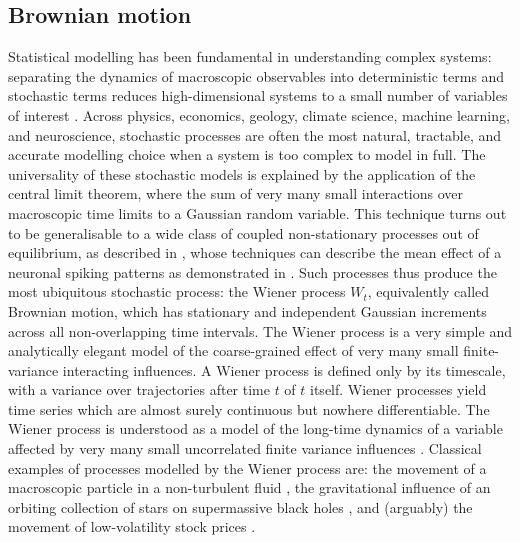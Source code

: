\subsection{Brownian motion}\label{brown_mot}
Statistical modelling has been fundamental in understanding complex systems: separating the dynamics of macroscopic observables into deterministic terms and stochastic terms reduces high-dimensional systems to a small number of variables of interest \cite{hassler_stochastic_2016, cunchala2024basicoverviewvariousstochastic}. Across physics, economics, geology, climate science, machine learning, and neuroscience, stochastic processes are often the most natural, tractable, and accurate modelling choice when a system is too complex to model in full. The universality of these stochastic models is explained by the application of the central limit theorem, where the sum of very many small interactions over macroscopic time limits to a Gaussian random variable. This technique turns out to be generalisable to a wide class of coupled non-stationary processes out of equilibrium, as described in \textcite{Izvekov_2025_Mori}, whose techniques can describe the mean effect of a neuronal spiking patterns as demonstrated in \textcite{La_Camera_2022_meanfieldneuron}. Such processes thus produce the most ubiquitous stochastic process: the Wiener process $W_t$, equivalently called Brownian motion, which has stationary and independent Gaussian increments across all non-overlapping time intervals. The Wiener process is a very simple and analytically elegant model of the coarse-grained effect of very many small finite-variance interacting influences. A Wiener process is defined only by its timescale, with a variance over trajectories after time $t$ of $t$ itself. Wiener processes yield time series which are almost surely continuous but nowhere differentiable. The Wiener process is understood as a model of the long-time dynamics of a variable affected by very many small uncorrelated finite variance influences \cite{hassler_stochastic_2016}. Classical examples of processes modelled by the Wiener process are: the movement of a macroscopic particle in a non-turbulent fluid \cite{hassler_stochastic_2016}, the gravitational influence of an orbiting collection of stars on supermassive black holes \cite{Chandrasekhar1943, Merritt2007a}, and (arguably) the movement of low-volatility stock prices \cite{cunchala2024basicoverviewvariousstochastic}.

